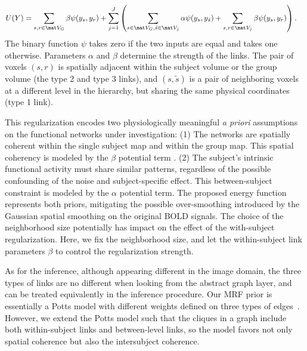 \documentclass[review,authoryear]{elsarticle}
\begin{document}
\begin{align}
  U(Y) &= \sum_{s,r\in\mat V_G} \beta \psi(y_s, y_r) + \sum_{j=1}^J \left ( \sum_{s\in\mat V_G, \tilde s\in\mat V_j} \alpha \psi(y_s, y_{\tilde s}) + \sum_{s,r\in\mat V_j}\beta\psi(y_s, y_r) \right ).\label{eq:energy}
\end{align}
The binary function $\psi$ takes zero if the two inputs are equal and takes one
otherwise. Parameters $\alpha$ and $\beta$ determine the strength of the
links. The pair of voxels $(s, r)$ is spatially adjacent within the subject
volume or the group volume (the type 2 and type 3 links), and $(s, \tilde s)$ is
a pair of neighboring voxels at a different level in the hierarchy, but sharing
the same physical coordinates (type 1 link).

This regularization encodes two physiologically meaningful \emph{a priori}
assumptions on the functional networks under investigation: (1) The networks are
spatially coherent within the single subject map and within the group map. This
spatial coherency is modeled by the $\beta$ potential term . (2) The subject's
intrinsic functional activity must share similar patterns, regardless of the
possible confounding of the noise and subject-specific effect. This
between-subject constraint is modeled by the $\alpha$ potential term. The
proposed energy function represents both priors, mitigating the possible
over-smoothing introduced by the Gaussian spatial smoothing on the original BOLD
signals. The choice of the neighborhood size potentially has impact on the
effect of the with-subject regularization. Here, we fix the neighborhood size,
and let the within-subject link parameters $\beta$ to control the regularization
strength.


As for the inference, although appearing different in the image domain,
the three types of links are no different when looking from the abstract graph
layer, and can be treated equivalently in the inference procedure.  Our MRF
prior is essentially a Potts model with different weights defined on three types
of edges~\citep{potts1952some}. However, we extend the Potts model such that the
cliques in a graph include both within-subject links and between-level links, so
the model favors not only spatial coherence but also the intersubject coherence.
\end{document}
